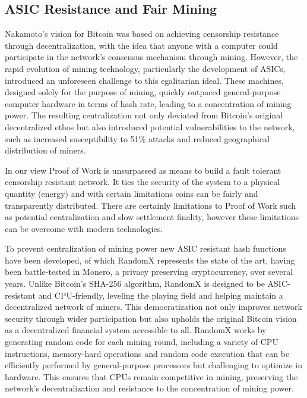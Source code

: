\documentclass{article}
\begin{document}
\subsection{ASIC Resistance and Fair Mining}

Nakamoto's vision for Bitcoin was based on achieving censorship resistance through decentralization, with the idea that anyone with a computer could participate in the network's consensus mechanism through mining. However, the rapid evolution of mining technology, particularly the development of ASICs, introduced an unforeseen challenge to this egalitarian ideal. These machines, designed solely for the purpose of mining, quickly outpaced general-purpose computer hardware in terms of hash rate, leading to a concentration of mining power. The resulting centralization not only deviated from Bitcoin's original decentralized ethos but also introduced potential vulnerabilities to the network, such as increased susceptibility to 51\% attacks and reduced geographical distribution of miners.

In our view Proof of Work is unsurpassed as means to build a fault tolerant censorship resistant network. It ties the security of the system to a physical quantity (energy) and with certain limitations coins can be fairly and transparently distributed. There are certainly limitations to Proof of Work such as potential centralization and slow settlement finality, however these limitations can be overcome with modern technologies.

To prevent centralization of mining power new ASIC resistant hash functions have been developed, of which RandomX represents the state of the art, having been battle-tested in Monero, a privacy preserving cryptocurrency, over several years. Unlike Bitcoin's SHA-256 algorithm, RandomX is designed to be ASIC-resistant and CPU-friendly, leveling the playing field and helping maintain a decentralized network of miners. This democratization not only improves network security through wider participation but also upholds the original Bitcoin vision as a decentralized financial system accessible to all. RandomX works by generating random code for each mining round, including a variety of CPU instructions, memory-hard operations and random code execution that can be efficiently performed by general-purpose processors but challenging to optimize in hardware. This ensures that CPUs remain competitive in mining, preserving the network's decentralization and resistance to the concentration of mining power.
\end{document}
